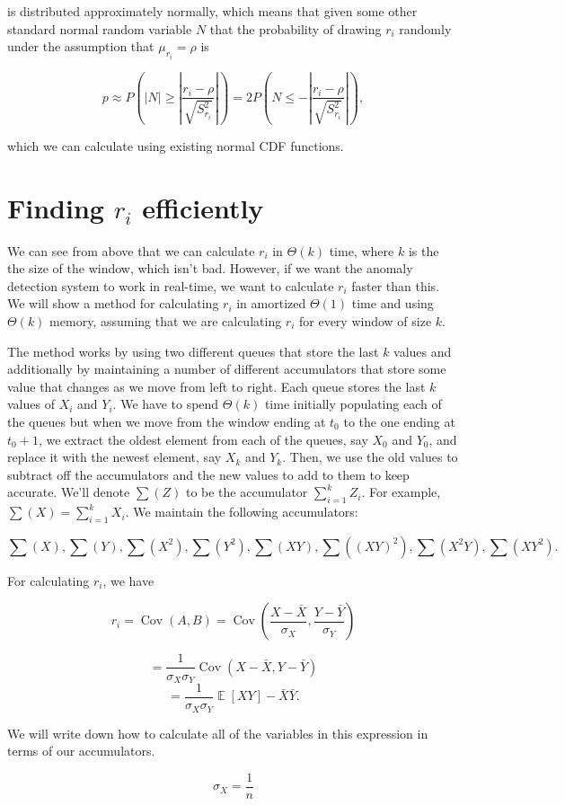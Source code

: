 \documentclass{article}
\DeclareMathOperator{\E}{\mathbb{E}}
\DeclareMathOperator{\Cov}{\mathrm{Cov}}
\begin{document}
is distributed approximately normally, which means that given some other standard normal random variable $N$ that the probability of drawing $r_i$ randomly under the assumption that $\mu_{r_i} = \rho$ is

$$p \approx P\left(|N| \ge \left|\frac{r_i - \rho}{\sqrt{S^2_{r_i}}}\right|\right)
= 2P\left(N \le -\left|\frac{r_i - \rho}{\sqrt{S^2_{r_i}}}\right|\right),$$

which we can calculate using existing normal CDF functions.

\section{Finding $r_i$ efficiently}

We can see from above that we can calculate $r_i$ in $\Theta(k)$ time, where $k$ is the the size of the window, which isn't bad. However, if we want the anomaly detection system to work in real-time, we want to calculate $r_i$ faster than this. We will show a method for calculating $r_i$ in amortized $\Theta(1)$ time and using $\Theta(k)$ memory, assuming that we are calculating $r_i$ for every window of size $k$.

The method works by using two different queues that store the last $k$ values and additionally by maintaining a number of different accumulators that store some value that changes as we move from left to right. Each queue stores the last $k$ values of $X_i$ and $Y_i$. We have to spend $\Theta(k)$ time initially populating each of the queues but when we move from the window ending at $t_0$ to the one ending at $t_0 + 1$, we extract the oldest element from each of the queues, say $X_0$ and $Y_0$, and replace it with the newest element, say $X_k$ and $Y_k$. Then, we use the old values to subtract off the accumulators and the new values to add to them to keep accurate. We'll denote $\sum(Z)$ to be the accumulator $\sum_{i = 1}^k Z_i$. For example, $\sum(X) = \sum_{i = 1}^k X_i$. We maintain the following accumulators:

$$\sum(X), \sum(Y), \sum(X^2), \sum(Y^2), \sum(XY), \sum((XY)^2), \sum(X^2 Y), \sum(XY^2).$$

For calculating $r_i$, we have

$$r_i = \Cov(A, B) = \Cov \left( \frac{X - \bar X}{\sigma_X}, \frac{Y - \bar Y}{\sigma_Y}\right)$$

$$= \frac{1}{\sigma_X \sigma_Y} \Cov(X - \bar X, Y - \bar Y)$$
$$ = \frac{1}{\sigma_X \sigma_Y} \E[XY] - \bar X \bar Y.$$

We will write down how to calculate all of the variables in this expression in terms of our accumulators.

$$\sigma_X = \frac{1}{n}$$




\end{document}
